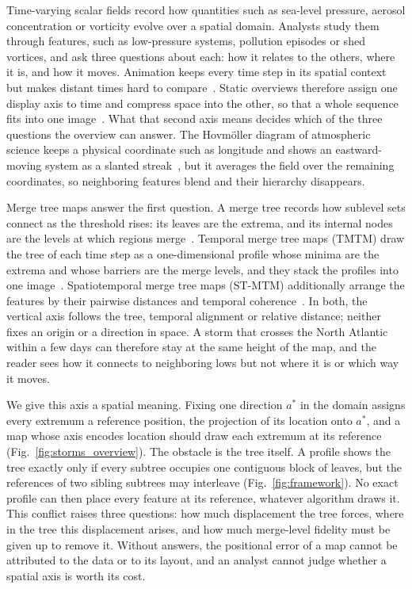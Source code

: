 \maketitle
\raggedbottom
\setlength{\emergencystretch}{1.5em}
Time-varying scalar fields record how quantities such as sea-level pressure, aerosol concentration or vorticity evolve over a spatial domain. Analysts study them through features, such as low-pressure systems, pollution episodes or shed vortices, and ask three questions about each: how it relates to the others, where it is, and how it moves. Animation keeps every time step in its spatial context but makes distant times hard to compare~\cite{Tversky:2002:Animation,Robertson:2008:Animation}. Static overviews therefore assign one display axis to time and compress space into the other, so that a whole sequence fits into one image~\cite{Bach:2017:STC}. What that second axis means decides which of the three questions the overview can answer. The Hovm\"oller diagram of atmospheric science keeps a physical coordinate such as longitude and shows an eastward-moving system as a slanted streak~\cite{Hovmoller:1949}, but it averages the field over the remaining coordinates, so neighboring features blend and their hierarchy disappears.

Merge tree maps answer the first question. A merge tree records how sublevel sets connect as the threshold rises: its leaves are the extrema, and its internal nodes are the levels at which regions merge~\cite{Heine:2016:Survey,Edelsbrunner:2002:TPS}. Temporal merge tree maps (TMTM) draw the tree of each time step as a one-dimensional profile whose minima are the extrema and whose barriers are the merge levels, and they stack the profiles into one image~\cite{Koepp:2023:TMTM}. Spatiotemporal merge tree maps (ST-MTM) additionally arrange the features by their pairwise distances and temporal coherence~\cite{STMTM:2026}. In both, the vertical axis follows the tree, temporal alignment or relative distance; neither fixes an origin or a direction in space. A storm that crosses the North Atlantic within a few days can therefore stay at the same height of the map, and the reader sees how it connects to neighboring lows but not where it is or which way it moves.

We give this axis a spatial meaning. Fixing one direction $a^*$ in the domain assigns every extremum a reference position, the projection of its location onto $a^*$, and a map whose axis encodes location should draw each extremum at its reference (Fig.~\ref{fig:storms_overview}). The obstacle is the tree itself. A profile shows the tree exactly only if every subtree occupies one contiguous block of leaves, but the references of two sibling subtrees may interleave (Fig.~\ref{fig:framework}). No exact profile can then place every feature at its reference, whatever algorithm draws it. This conflict raises three questions: how much displacement the tree forces, where in the tree this displacement arises, and how much merge-level fidelity must be given up to remove it. Without answers, the positional error of a map cannot be attributed to the data or to its layout, and an analyst cannot judge whether a spatial axis is worth its cost.

